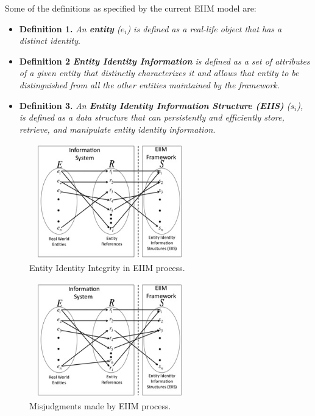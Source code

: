 Some of the definitions as specified by the current EIIM model are:

\begin{itemize}
\item \textbf{Definition 1.} \textit{An \textbf{entity} (\textbf{$e_{i}$}) is defined as a real-life object that has a distinct identity}.

\item \textbf{Definition 2} \textit{\textbf{Entity Identity Information} is defined as a set of attributes of a given entity that distinctly characterizes it and allows that entity to be distinguished from all the other entities maintained by the framework.}

\item \textbf{Definition 3.} \textit{An \textbf{Entity Identity Information Structure (EIIS)} (\textbf{$s_{i}$}), is defined as a data structure that can persistently and efficiently store, retrieve, and manipulate entity identity information}.
\end{itemize}







\begin{figure}[htbp]
  \caption{Entity Identity Integrity in EIIM process.}
\label{identityIntegrity1}
  \centering
    \includegraphics[width=7cm,height=5cm]{Figures/identityIntegrityMDM1.jpg}
\end{figure}



\begin{figure}[htbp]
  \caption{Misjudgments made by EIIM process.}
\label{identityIntegrity2}
  \centering
    \includegraphics[width=7cm,height=5cm]{Figures/identityIntegrityMDM2.jpg}
\end{figure}


